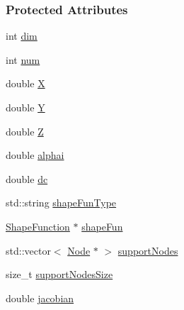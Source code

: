 \subsubsection*{Protected Attributes}
\begin{DoxyCompactItemize}
\item 
int \hyperlink{classmknix_1_1_point_ab97e4bca7f299237ff3f8cc2449b1be1}{dim}
\item 
int \hyperlink{classmknix_1_1_point_a685cfce9b9c1da43e3a2460b6c0a6855}{num}
\item 
double \hyperlink{classmknix_1_1_point_a1ab5edb86e6de2df07c3d11ed7c2ca99}{X}
\item 
double \hyperlink{classmknix_1_1_point_aeb9947adb5c6a4cd01ca81f4c4934ed5}{Y}
\item 
double \hyperlink{classmknix_1_1_point_a1742974a0d33897c3b04bc420ef87d31}{Z}
\item 
double \hyperlink{classmknix_1_1_point_afbd74e8b9e7081984e5b03d802f7ae14}{alphai}
\item 
double \hyperlink{classmknix_1_1_point_a310b40e3859627d344de048bbdb1db6f}{dc}
\item 
std\+::string \hyperlink{classmknix_1_1_point_a60c4d06445f397a9813b9a7f2a563d0d}{shape\+Fun\+Type}
\item 
\hyperlink{classmknix_1_1_shape_function}{Shape\+Function} $\ast$ \hyperlink{classmknix_1_1_point_a852c997f667d6029c6062ef68582c275}{shape\+Fun}
\item 
std\+::vector$<$ \hyperlink{classmknix_1_1_node}{Node} $\ast$ $>$ \hyperlink{classmknix_1_1_point_a3e608826c9042a2ddad6053f5b233211}{support\+Nodes}
\item 
size\+\_\+t \hyperlink{classmknix_1_1_point_a141fd098ad72a85cb4d11362b80ca0d8}{support\+Nodes\+Size}
\item 
double \hyperlink{classmknix_1_1_point_a7afc6bd82b8e3619d384a41d9c2f1601}{jacobian}
\end{DoxyCompactItemize}
